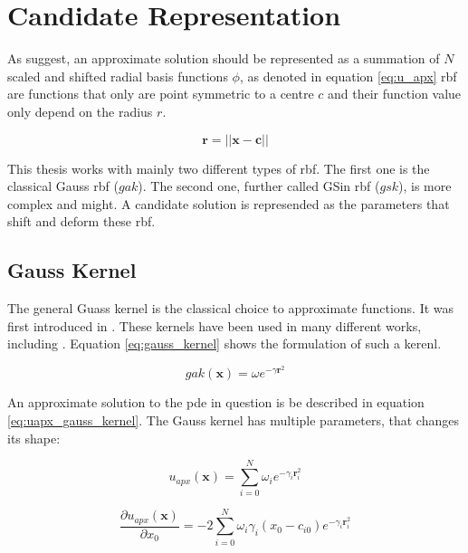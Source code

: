 \documentclass[./\jobname.tex]{subfiles}
\begin{document}
\section{Candidate Representation}
\label{chap:candidate_rep}

As \cite{chaquet_using_2019} suggest, an approximate solution should be represented as a summation of $N$ scaled and shifted radial basis functions $\phi$, as denoted in equation \ref{eq:u_apx}  \gls{rbf} are functions that only are point symmetric to a centre $c$ and their function value only depend on the radius $r$. 

\begin{equation}
\label{eq: radius}
\mathbf{r} = \left|\left|\mathbf{x} - \mathbf{c} \right|\right|
\end{equation}

This thesis works with mainly two different types of \gls{rbf}. The first one is the classical Gauss \gls{rbf} ($gak$). The second one, further called GSin \gls{rbf} ($gsk$), is more complex and might. A candidate solution is represended as the parameters that shift and deform these \gls{rbf}. 

\subsection{Gauss Kernel}
\label{chap:gauss_kernel}

The general Guass kernel is the classical choice to approximate functions. It was first introduced in \cite{broomhead_multivariable_1988}. These kernels have been used in many different works, including \cite{chaquet_using_2019}. Equation \ref{eq:gauss_kernel} shows the formulation of such a kerenl. 

\begin{equation}
\label{eq:gauss_kernel}
gak(\mathbf{x}) = \omega e^{-\gamma \mathbf{r}^2}
\end{equation}

An approximate solution to the \gls{pde} in question is be described in equation \ref{eq:uapx_gauss_kernel}. The Gauss kernel has multiple parameters, that changes its shape: 

\begin{equation}
\label{eq:uapx_gauss_kernel}
u_{apx}(\mathbf{x}) = \sum_{i=0}^{N} \omega_i e^{-\gamma_i \mathbf{r}_i^2}
\end{equation}



\begin{equation}
\label{eq:uapx_gauss_kernel_x0}
\frac{\partial u_{apx}(\mathbf{x})}{\partial x_0} = -2 \sum_{i=0}^{N} \omega_i \gamma_i (x_0 - c_{i0}) e^{-\gamma_i \mathbf{r}_i^2}
\end{equation}
\end{document}
